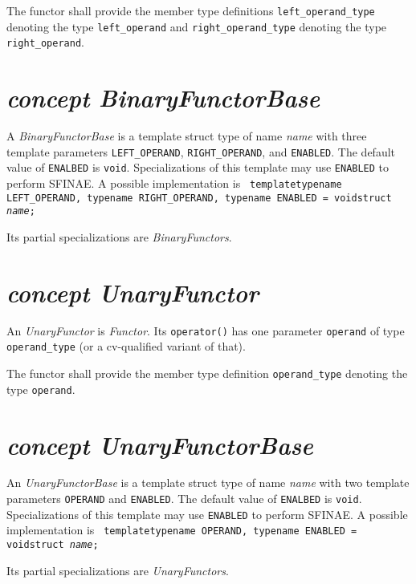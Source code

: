 \noindent{}The functor shall provide the member type              definitions
\texttt{left\_operand\_type}  denoting the type \texttt{left\_operand}    and
\texttt{right\_operand\_type} denoting the type      \texttt{right\_operand}.
\newline

\section{\textit{concept BinaryFunctorBase}}
A  \textit{BinaryFunctorBase} is a template struct type of   name \textit{name}
with three template parameters \texttt{LEFT\_OPERAND}, \texttt{RIGHT\_OPERAND},
and \texttt{ENABLED}. The default value of \texttt{ENALBED} is   \texttt{void}.
Specializations of this template may use \texttt{ENABLED} to    perform SFINAE.
A possible implementation is
\texttt{\newline
\noindent{}template\textlangle typename LEFT\_OPERAND, typename RIGHT\_OPERAND,
typename ENABLED = void\textrangle\newline\noindent{}struct \textit{name};    }
\newline

\noindent{}Its partial specializations are \textit{BinaryFunctors}.
\section{\textit{concept UnaryFunctor}}
An \textit{UnaryFunctor} is \textit{Functor}.
Its \texttt{operator()} has one parameter \texttt{operand}  of type
\texttt{operand\_type} (or a cv-qualified variant of that).\newline

\noindent{}The functor shall provide the member type definition
\texttt{operand\_type} denoting the type      \texttt{operand}.

\section{\textit{concept UnaryFunctorBase}}
An \textit{UnaryFunctorBase} is a template struct type of     name \textit{name}
with two  template parameters \texttt{OPERAND} and \texttt{ENABLED}. The default
value of \texttt{ENALBED} is \texttt{void}. Specializations of this template may
use \texttt{ENABLED} to perform SFINAE.
A possible implementation is
\texttt{\newline
\noindent{}template\textlangle typename OPERAND,
typename ENABLED = void\textrangle\newline\noindent{}struct \textit{name};    }
\newline

\noindent{}Its partial specializations are \textit{UnaryFunctors}.

